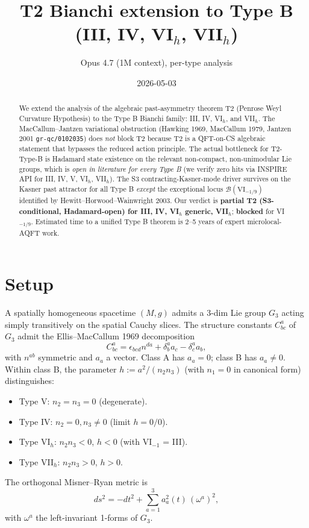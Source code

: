 \documentclass[11pt,a4paper]{article}
\title{T2 Bianchi extension to Type B (III, IV, VI$_h$, VII$_h$)}
\author{Opus 4.7 (1M context), per-type analysis}
\date{2026-05-03}
\begin{document}
\maketitle

\begin{abstract}
We extend the analysis of the algebraic past-asymmetry theorem T2 (Penrose
Weyl Curvature Hypothesis) to the Type B Bianchi family: III, IV, VI$_h$,
and VII$_h$. The MacCallum--Jantzen variational obstruction (Hawking 1969,
MacCallum 1979, Jantzen 2001 \texttt{gr-qc/0102035}) does \emph{not} block
T2 because T2 is a QFT-on-CS algebraic statement that bypasses the reduced
action principle. The actual bottleneck for T2-Type-B is Hadamard state
existence on the relevant non-compact, non-unimodular Lie groups, which is
\emph{open in literature for every Type B} (we verify zero hits via INSPIRE
API for III, IV, V, VI$_h$, VII$_h$). The S3 contracting-Kasner-mode
driver survives on the Kasner past attractor for all Type B
\emph{except} the exceptional locus $\mathcal{B}(\mathrm{VI}_{-1/9})$
identified by Hewitt--Horwood--Wainwright 2003. Our verdict is
\textbf{partial T2 (S3-conditional, Hadamard-open) for III, IV, VI$_h$
generic, VII$_h$}; \textbf{blocked} for VI$_{-1/9}$. Estimated time to a
unified Type B theorem is 2--5 years of expert microlocal-AQFT work.
\end{abstract}

\section{Setup}

A spatially homogeneous spacetime $(M,g)$ admits a 3-dim Lie group $G_3$
acting simply transitively on the spatial Cauchy slices. The structure
constants $C^a_{bc}$ of $G_3$ admit the Ellis--MacCallum 1969 decomposition
\begin{equation}
C^a_{bc} = \epsilon_{bcd} n^{da} + \delta^a_b a_c - \delta^a_c a_b,
\label{eq:EM}
\end{equation}
with $n^{ab}$ symmetric and $a_a$ a vector. Class A has $a_a = 0$; class B
has $a_a \neq 0$. Within class B, the parameter
$h := a^2 / (n_2 n_3)$ (with $n_1 = 0$ in canonical form) distinguishes:
\begin{itemize}
\item Type V: $n_2 = n_3 = 0$ (degenerate).
\item Type IV: $n_2 = 0, n_3 \neq 0$ (limit $h = 0/0$).
\item Type VI$_h$: $n_2 n_3 < 0$, $h < 0$ (with VI$_{-1}$ = III).
\item Type VII$_h$: $n_2 n_3 > 0$, $h > 0$.
\end{itemize}
The orthogonal Misner--Ryan metric is
\begin{equation}
ds^2 = -dt^2 + \sum_{a=1}^{3} a_a^2(t)\, (\omega^a)^2,
\label{eq:metric}
\end{equation}
with $\omega^a$ the left-invariant 1-forms of $G_3$.
\end{document}
